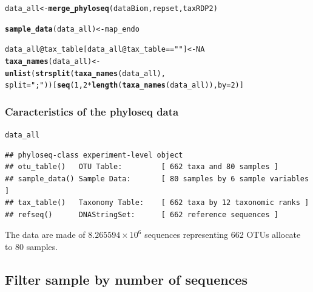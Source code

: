 \documentclass[12pt]{article}\usepackage[]{graphicx}\usepackage[]{color}
\makeatletter
\newcommand{\hlnum}[1]{\textcolor[rgb]{0.686,0.059,0.569}{#1}}%
\newcommand{\hlstr}[1]{\textcolor[rgb]{0.192,0.494,0.8}{#1}}%
\newcommand{\hlopt}[1]{\textcolor[rgb]{0,0,0}{#1}}%
\newcommand{\hlstd}[1]{\textcolor[rgb]{0.345,0.345,0.345}{#1}}%
\newcommand{\hlkwb}[1]{\textcolor[rgb]{0.69,0.353,0.396}{#1}}%
\newcommand{\hlkwc}[1]{\textcolor[rgb]{0.333,0.667,0.333}{#1}}%
\newcommand{\hlkwd}[1]{\textcolor[rgb]{0.737,0.353,0.396}{\textbf{#1}}}%
\newenvironment{kframe}{%
 \def\at@end@of@kframe{}%
 \ifinner\ifhmode%
  \def\at@end@of@kframe{\end{minipage}}%
  \begin{minipage}{\columnwidth}%
 \fi\fi%
 \def\FrameCommand##1{\hskip\@totalleftmargin \hskip-\fboxsep
 \colorbox{shadecolor}{##1}\hskip-\fboxsep
     \hskip-\linewidth \hskip-\@totalleftmargin \hskip\columnwidth}%
 \MakeFramed {\advance\hsize-\width
   \@totalleftmargin\z@ \linewidth\hsize
   \@setminipage}}%
 {\par\unskip\endMakeFramed%
 \at@end@of@kframe}
\newenvironment{knitrout}{}{} %
\numberwithin{figure}{section}
\makeatother
\begin{document}
\begin{knitrout}\small
{}\color{fgcolor}\begin{kframe}
\begin{alltt}
\hlstd{data_all} \hlkwb{<-} \hlkwd{merge_phyloseq}\hlstd{(dataBiom, repset, taxRDP2)}

\hlkwd{sample_data}\hlstd{(data_all)} \hlkwb{<-} \hlstd{map_endo}

\hlstd{data_all}\hlopt{@}\hlkwc{tax_table}\hlstd{[data_all}\hlopt{@}\hlkwc{tax_table} \hlopt{==} \hlstr{""}\hlstd{]} \hlkwb{<-} \hlnum{NA}
\hlkwd{taxa_names}\hlstd{(data_all)} \hlkwb{<-}
  \hlkwd{unlist}\hlstd{(}\hlkwd{strsplit}\hlstd{(}\hlkwd{taxa_names}\hlstd{(data_all) ,}
                  \hlkwc{split} \hlstd{=} \hlstr{";"}\hlstd{))[}\hlkwd{seq}\hlstd{(}\hlnum{1}\hlstd{,} \hlnum{2}\hlopt{*}\hlkwd{length}\hlstd{(}\hlkwd{taxa_names}\hlstd{(data_all)),} \hlkwc{by}\hlstd{=}\hlnum{2}\hlstd{)]}
\end{alltt}
\end{kframe}
\end{knitrout}

\subsubsection{Caracteristics of the phyloseq data}

\begin{knitrout}\small
{}\color{fgcolor}\begin{kframe}
\begin{alltt}
\hlstd{data_all}
\end{alltt}
\begin{verbatim}
## phyloseq-class experiment-level object
## otu_table()   OTU Table:         [ 662 taxa and 80 samples ]
## sample_data() Sample Data:       [ 80 samples by 6 sample variables ]
## tax_table()   Taxonomy Table:    [ 662 taxa by 12 taxonomic ranks ]
## refseq()      DNAStringSet:      [ 662 reference sequences ]
\end{verbatim}
\end{kframe}
\end{knitrout}

The data are made of \ensuremath{8.265594\times 10^{6}} sequences representing 662 OTUs allocate to 80 samples.

  \subsection{Filter sample by number of sequences}
\end{document}
